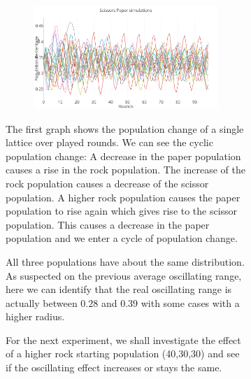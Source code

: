 \documentclass[a4paper, 11pt]{article}
\begin{document}
\begin{figure}[H]
\begin{subfigure}{.65\textwidth}
	\begin{subfigure}{1\textwidth}
		\includegraphics[width=1\linewidth]{50x50_33RockDist_Scissors}
	\end{subfigure}		
	
\end{subfigure}%
\begin{subfigure}{.35\textwidth}
	The first graph shows the population change of a single lattice over played rounds. We can see the cyclic population change: A decrease in the paper population causes a rise in the rock population. The increase of the rock population causes a decrease of the scissor population. A higher rock population causes the paper population to rise again which gives rise to the scissor population. This causes a decrease in the paper population and we enter a cycle of population change.


	All three populations have about the same distribution. As suspected on the previous average oscillating range, here we can identify that the real oscillating range is actually between $0.28$ and $0.39$ with some cases with a higher radius.
	
	
	For the next experiment, we shall investigate the effect of a higher rock starting population (40,30,30) and see if the oscillating effect increases or stays the same.
\end{subfigure}

\end{figure}



\end{document}
